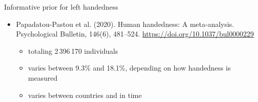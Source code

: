 \documentclass[english,t]{beamer}
\begin{document}
\begin{frame}{Informative prior for left handedness}

  \begin{itemize}
  \item Papadatou-Pastou et al. (2020). Human handedness: A meta-analysis.
    Psychological Bulletin, 146(6), 481–524. \url{https://doi.org/10.1037/bul0000229}
    \begin{itemize}
    \item totaling 2\,396\,170 individuals
    \item varies between 9.3\% and 18.1\%, depending on how handedness is measured
    \item varies between countries and in time
    \end{itemize}
  \end{itemize}
  
\end{frame}
\end{document}
